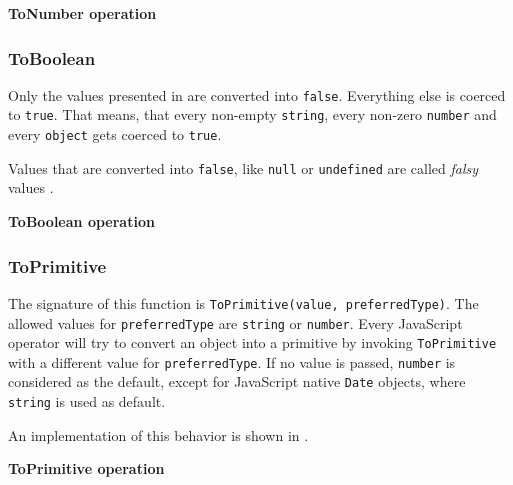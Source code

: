 \begin{code}
	\captionsetup{aboveskip=0pt, belowskip=10pt}
	\caption[ToNumber operation]{\textbf{ToNumber operation}}
	\label{code:background-to-number-operation}
\end{code}


\subsubsection{ToBoolean}
Only the values presented in  are converted into \texttt{false}. Everything else is coerced to \texttt{true}. That means, that every non-empty \texttt{string}, every non-zero \texttt{number} and every \texttt{object} gets coerced to \texttt{true}.

Values that are converted into \texttt{false}, like \texttt{null} or \texttt{undefined} are called \textit{falsy} values \citep{you-dont-know-js}.

\begin{code}
	\captionsetup{aboveskip=0pt, belowskip=10pt}
	\caption[ToBoolean operation]{\textbf{ToBoolean operation}}
	\label{code:background-to-boolean-operation}
\end{code}

\subsubsection{ToPrimitive}
The signature of this function is \texttt{ToPrimitive(value, preferredType)}. The allowed values for \texttt{preferredType} are \texttt{string} or \texttt{number}. Every JavaScript operator will try to convert an object into a primitive by invoking \texttt{ToPrimitive} with a different value for \texttt{preferredType}. If no value is passed, \texttt{number} is considered as the default, except for JavaScript native \texttt{Date} objects, where \texttt{string} is used as default.

An implementation of this behavior is shown in .

\begin{code}
	\captionsetup{aboveskip=0pt, belowskip=10pt}
	\caption[ToPrimitive operation]{\textbf{ToPrimitive operation}}
	\label{code:background-to-primitive-operation}
\end{code}

